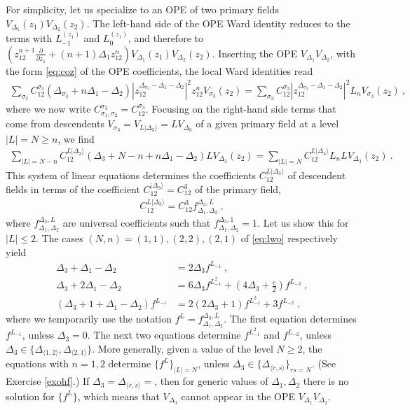 \documentclass[12pt, a4paper, notitlepage, twoside]{report}
\numberwithin{equation}{section}
\theoremstyle{break}
\begin{document}
For simplicity, let us specialize to an OPE of two primary fields $V_{\Delta_1}(z_1)V_{\Delta_2}(z_2)$. 
The left-hand side of the OPE Ward identity reduces to the terms with $L_{-1}^{(z_1)}$ and $L_0^{(z_1)}$, and therefore to $\left(z_{12}^{n+1}\frac{\partial}{\partial z_1} + (n+1)\Delta_1z_{12}^n\right) V_{\Delta_1}(z_1)V_{\Delta_2}(z_2)$. 
Inserting the OPE $V_{\Delta_1}V_{\Delta_2}$, with 
the form \eqref{eq:coz} of the OPE coefficients, 
the local Ward identities read 
\begin{align}
 \sum_{\sigma_3} C^{\sigma_3}_{12}(\Delta_{\sigma_3} + n\Delta_1-\Delta_2) 
 \left| z_{12}^{\Delta_{{\sigma_3}}-\Delta_1-\Delta_2}\right|^2 z_{12}^n V_{\sigma_3}(z_2) 
 = 
 \sum_{\sigma_3} C^{\sigma_3}_{12} 
 \left| z_{12}^{\Delta_{{\sigma_3}}-\Delta_1-\Delta_2} \right|^2 L_nV_{\sigma_3}(z_2)\ ,
\end{align}
where we now write $C^{\sigma_3}_{\sigma_1,\sigma_2}=C^{\sigma_3}_{12}$.
Focusing on the right-hand side terms that come from descendents $V_{\sigma_3}= V_{L|\Delta_3\rangle}= LV_{\Delta_3}$ of a given primary field at a level $|L|=N\geq n$, we find
\begin{align}
 \sum_{|L|=N-n} C^{L|\Delta_3\rangle}_{12}(\Delta_3+N-n+n\Delta_1-\Delta_2)L V_{\Delta_3}(z_2)
 = 
 \sum_{|L|=N} C^{L|\Delta_3\rangle}_{12}L_nL V_{\Delta_3}(z_2)\ .
 \label{eq:lwo}
\end{align}
This system of linear equations determines the coefficients $C^{L|\Delta_3\rangle}_{12}$ of descendent fields in terms of the coefficient $C^{|\Delta_3\rangle}_{12}=C^3_{12}$ of the primary field,
\begin{align}
 C^{L|\Delta_3\rangle}_{12} 
 = 
 C^{3}_{12} f^{\Delta_3,L}_{\Delta_1,\Delta_2}\ ,
\end{align}
where  $f^{\Delta_3,L}_{\Delta_1,\Delta_2}$ are universal coefficients such that $f^{\Delta_3,1}_{\Delta_1,\Delta_2} =1$.
Let us show this for $|L|\leq 2$. The cases $(N,n)=(1,1),(2,2),(2,1)$ of \eqref{eq:lwo} respectively yield 
\begin{align}
 \Delta_3 + \Delta_1-\Delta_2 & = 2\Delta_3 f^{L_{-1}} \ ,
 \label{flfo}
 \\
 \Delta_3+ 2\Delta_1-\Delta_2 & = 6\Delta_3 f^{L_{-1}^2} + (4\Delta_3+\tfrac{c}{2})f^{L_{-2}}\ ,
 \\
 (\Delta_3+1+\Delta_1-\Delta_2) f^{L_{-1}} & = 2(2\Delta_3+1) f^{L_{-1}^2} + 3 f^{L_{-2}}\ ,
 \label{flff}
\end{align}
where we temporarily use the notation $f^L=f^{\Delta_3,L}_{\Delta_1,\Delta_2}$.
The first equation determines $f^{L_{-1}}$, unless $\Delta_3=0$. The next two equations determine
$f^{L_{-1}^2}$ and $f^{L_{-2}}$, unless $\Delta_3 \in \{\Delta_{\langle 1,2 \rangle}, \Delta_{\langle 2,1 \rangle}\}$.
More generally, given a value of the level $N\geq 2$, the equations with $n=1,2$ determine $\{f^L\}_{|L|=N}$, unless $\Delta_3\in\{\Delta_{\langle r,s \rangle}\}_{rs=N}$. (See Exercise \ref{exohf}.) If $\Delta_3=\Delta_{\langle r,s \rangle}=$, then for generic values of $\Delta_1,\Delta_2$ there is no solution for $\{f^L\}$, which means that $V_{\Delta_3}$ cannot appear in the OPE $V_{\Delta_1}V_{\Delta_2}$.
\end{document}

